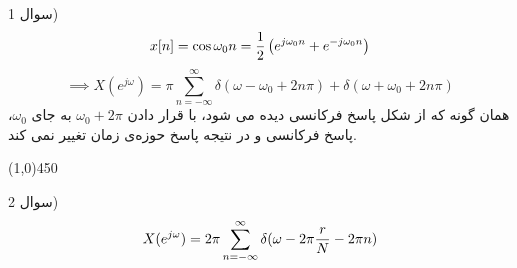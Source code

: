 \documentclass[50pt]{article}
\newcommand{\hl}{
\begin{center}
\line(1,0){450}
\end{center}}
\begin{document}
\setLTR 




\begin{RTL}
\Large{
سوال 1)
$$
x[n]=\cos \omega_0 n={1\over 2}\left(e^{j\omega_0 n}+e^{-j\omega_0 n}\right)
$$
\[
\implies X(e^{j\omega})=\pi\sum_{n=-\infty}^{\infty}\delta(\omega-\omega_0+2n\pi)+
\delta(\omega+\omega_0+2n\pi)
\]
همان گونه که از شکل پاسخ فرکانسی دیده می شود، با قرار دادن $\omega_0+2\pi$ به جای $\omega_0$، پاسخ فرکانسی و در نتیجه پاسخ حوزه‌ی زمان تغییر نمی کند.
\hl
سوال 2)
\[
X(e^{j\omega})=2\pi\sum_{n=-\infty}^{\infty}\delta(\omega-2\pi{r\over N}-2\pi n)
\]




}





\end{RTL}
\end{document}
